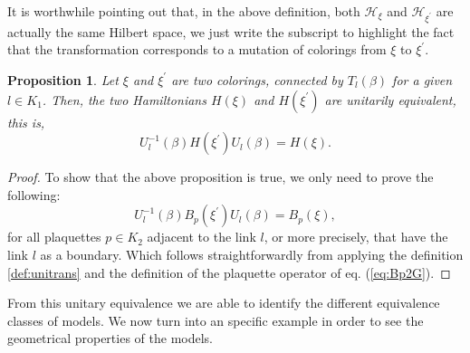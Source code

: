 \documentclass[a4paper,11pt]{article}
\theoremstyle{plain}%
\newtheorem{prop}[thm]{Proposition}
\theoremstyle{definition}
\theoremstyle{remark}
\begin{document}
It is worthwhile pointing out that, in the above definition, both $\mathcal{H}_\xi$ and $\mathcal{H}_{\xi^{\prime}}$ are actually the same Hilbert space, we just write the subscript to highlight the fact that the transformation corresponds to a mutation of colorings from $\xi$ to $\xi^{\prime}$. 
\begin{prop} Let $\xi$ and $\xi^{\prime}$ are two colorings, connected by $T_l(\beta)$ for a given $l \in K_1$. Then, the two Hamiltonians $H(\xi)$ and $H(\xi^{\prime})$ are unitarily equivalent, this is,
\[U_l^{-1}(\beta)H(\xi^{\prime})U_l(\beta) = H(\xi).\]
\end{prop}
\begin{proof}
To show that the above proposition is true, we only need to prove the following:
\[U_l^{-1}(\beta)B_p(\xi^{\prime})U_l(\beta) = B_p(\xi),\]
for all plaquettes $p \in K_2$ adjacent to the link $l$, or more precisely, that have the link $l$ as a boundary. Which follows straightforwardly from applying the definition \ref{def:unitrans} and the definition of the plaquette operator of eq. (\ref{eq:Bp2G}).
\end{proof}
From this unitary equivalence we are able to identify the different equivalence classes of models.
We now turn into an specific example in order to see the geometrical properties of the models. 
\end{document}
